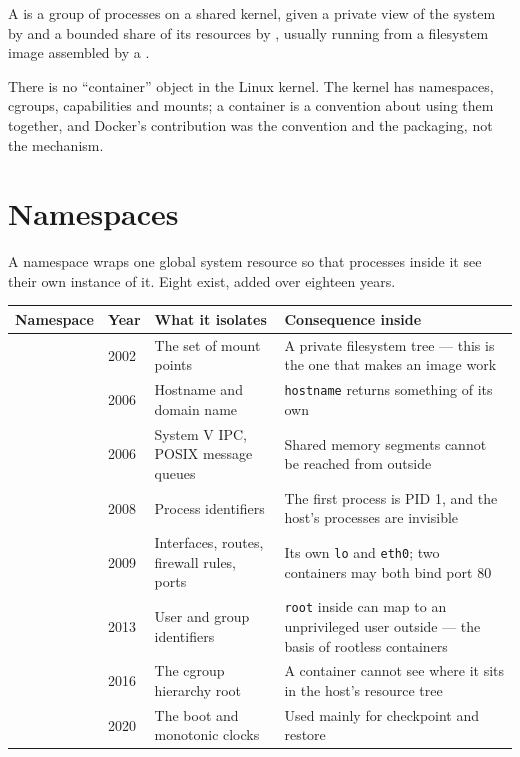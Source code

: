 \begin{definitionbox}[Container]
A  is a group of processes on a shared kernel, given a private
view of the system by  and a bounded share of its resources by
, usually running from a filesystem image assembled by a
.

\smallskip
There is no ``container'' object in the Linux kernel. The kernel has
namespaces, cgroups, capabilities and mounts; a container is a convention about
using them together, and Docker's contribution was the convention and the
packaging, not the mechanism.
\end{definitionbox}

\section{Namespaces}

A namespace wraps one global system resource so that processes inside it see
their own instance of it. Eight exist, added over eighteen years.

\begin{longtable}{@{}L{2.5cm}L{1.3cm}L{5.4cm}L{5.5cm}@{}}
\toprule
{}
\textbf{Namespace} & \textbf{Year} & \textbf{What it isolates} &
\textbf{Consequence inside} \\
\midrule
\endhead
{} & 2002 & The set of mount points & A private filesystem tree ---
this is the one that makes an image work \\
 & 2006 & Hostname and domain name & \texttt{hostname} returns
something of its own \\
 & 2006 & System V IPC, POSIX message queues & Shared memory
segments cannot be reached from outside \\
 & 2008 & Process identifiers & The first process is PID 1, and the
host's processes are invisible \\
 & 2009 & Interfaces, routes, firewall rules, ports & Its own
\texttt{lo} and \texttt{eth0}; two containers may both bind port 80 \\
 & 2013 & User and group identifiers & \texttt{root} inside can map
to an unprivileged user outside --- the basis of rootless containers \\
 & 2016 & The cgroup hierarchy root & A container cannot see where
it sits in the host's resource tree \\
 & 2020 & The boot and monotonic clocks & Used mainly for
checkpoint and restore \\
\bottomrule
\end{longtable}

